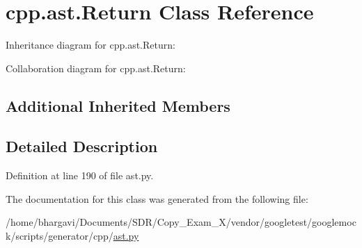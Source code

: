 \hypertarget{classcpp_1_1ast_1_1_return}{}\section{cpp.\+ast.\+Return Class Reference}
\label{classcpp_1_1ast_1_1_return}


Inheritance diagram for cpp.\+ast.\+Return\+:


Collaboration diagram for cpp.\+ast.\+Return\+:
\subsection*{Additional Inherited Members}


\subsection{Detailed Description}


Definition at line 190 of file ast.\+py.



The documentation for this class was generated from the following file\+:\begin{DoxyCompactItemize}
\item 
/home/bhargavi/\+Documents/\+S\+D\+R/\+Copy\+\_\+\+Exam\+\_\+X/vendor/googletest/googlemock/scripts/generator/cpp/\hyperlink{ast_8py}{ast.\+py}\end{DoxyCompactItemize}
